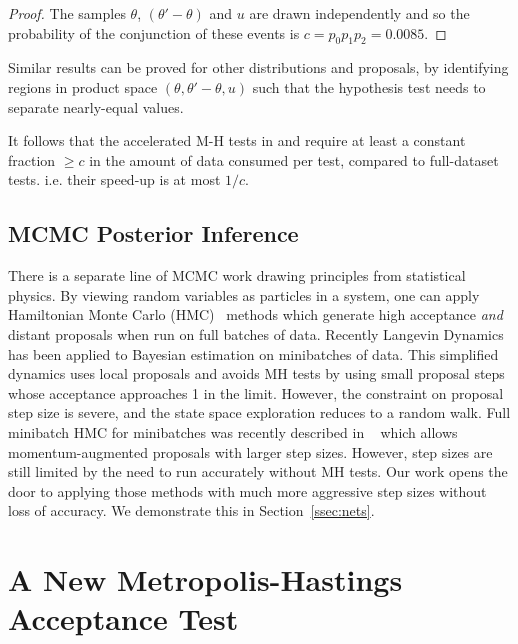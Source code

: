 \documentclass{article}
\begin{document}
\begin{proof}
  The samples $\theta$, $(\theta'-\theta)$
  and $u$ are drawn independently and so the probability of the conjunction of these events is
  $c = p_0 p_1 p_2 = 0.0085$.
\end{proof}

Similar results can be proved for other distributions and proposals, by identifying
regions in product space $(\theta,\theta'-\theta,u)$ such that the hypothesis test
needs to separate nearly-equal values. 

It follows that the accelerated M-H tests in \cite{icml2014c1_bardenet14} and
\cite{cutting_mh_2014} require at least a constant fraction $\geq c$
in the amount of data consumed per test, compared to full-dataset tests.
i.e. their speed-up is at most $1/c$.

\subsection{MCMC Posterior Inference}
There is a separate line of MCMC work drawing principles from
statistical physics. By viewing random variables as particles in a
system, one can apply Hamiltonian Monte Carlo
(HMC)~\cite{mcmc_hamiltonian_2010} methods which generate high
acceptance \emph{and} distant proposals when run on full batches of
data. Recently Langevin
Dynamics~\cite{langevin_2011,conf/icml/AhnBW12} has been applied to
Bayesian estimation on minibatches of data. This simplified dynamics
uses local proposals and avoids MH tests by using small proposal steps
whose acceptance approaches 1 in the limit. However, the constraint on
proposal step size is severe, and the state space exploration reduces
to a random walk. Full minibatch HMC for minibatches was recently
described in ~\cite{sghmc_2014} which allows momentum-augmented
proposals with larger step sizes. However, step sizes are still
limited by the need to run accurately without MH tests.
Our work opens the door to applying those methods with much
more aggressive step sizes without loss of accuracy. We demonstrate
this in Section~\ref{ssec:nets}.





\section{A New Metropolis-Hastings Acceptance Test}\label{sec:our_algorithm}
\end{document}
